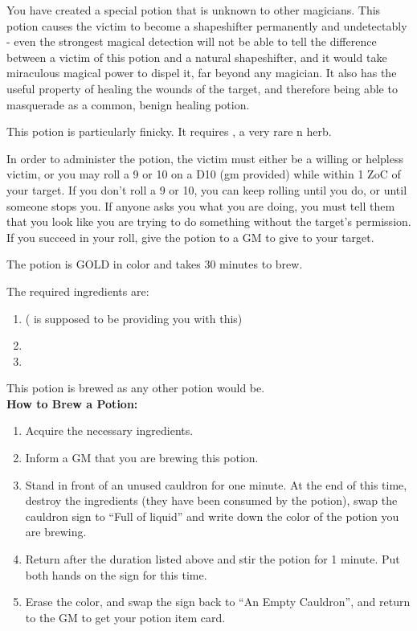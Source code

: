 \documentclass[green]{NeptuneBall}
\begin{document}
\name{\gShapeshifter{}}

You have created a special potion that is unknown to other magicians. This potion causes the victim to become a shapeshifter permanently and undetectably - even the strongest magical detection will not be able to tell the difference between a victim of this potion and a natural shapeshifter, and it would take miraculous magical power to dispel it, far beyond any magician. It also has the useful property of healing the wounds of the target, and therefore being able to masquerade as a common, benign healing potion.

This potion is particularly finicky. It requires \iHemlock{}, a very rare \pPacifica{}n herb.

In order to administer the potion, the victim must either be a willing or helpless victim, or you may roll a 9 or 10 on a D10 (gm provided) while within 1 ZoC of your target. If you don't roll a 9 or 10, you can keep rolling until you do, or until someone stops you. If anyone asks you what you are doing, you must tell them that you look like you are trying to do something without the target's permission. If you succeed in your roll, give the potion to a GM to give to your target.

The potion is GOLD in color and takes 30 minutes to brew. 

The required ingredients are:
\begin{enumerate}
\item \iHemlock{} (\cSpy{} is supposed to be providing you with this)
\item \iSquid{}
\item \iBarnacle{}
\end{enumerate}

This potion is brewed as any other potion would be.\\

{\bf How to Brew a Potion:}\\ %
\begin{enumerate}
  \item Acquire the necessary ingredients.
	\item Inform a GM that you are brewing this potion.
  \item Stand in front of an unused cauldron for one minute. At the end of this time, destroy the ingredients (they have been consumed by the potion), swap the cauldron sign to ``Full of liquid'' and write down the color of the potion you are brewing.
  \item Return after the duration listed above and stir the potion for 1 minute. Put both hands on the sign for this time.
  \item Erase the color, and swap the sign back to ``An Empty Cauldron'', and return to the GM to get your potion item card.
\end{enumerate}
\end{document}

